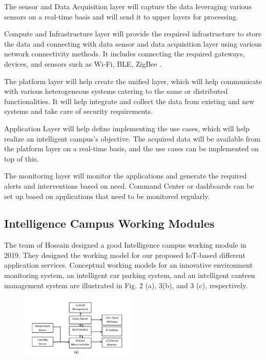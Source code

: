 \documentclass[conference]{IEEEtran}
\begin{document}
The sensor and Data Acquisition layer will capture the data leveraging various sensors on a real-time basis and will send it to upper layers for processing. 

Compute and Infrastructure layer will provide the required infrastructure to store the data and connecting with data sensor and data acquisition layer using various network connectivity methods. It includes connecting the required gateways, devices, and sensors such as Wi-Fi, BLE, ZigBee \cite{INTCAMPUS:IOTBasedModel}. 

The platform layer will help create the unified layer, which will help communicate with various heterogeneous systems catering to the same or distributed functionalities. It will help integrate and collect the data from existing and new systems and take care of security requirements.

Application Layer will help define implementing the use cases, which will help realize an intelligent campus's objective. The acquired data will be available from the platform layer on a real-time basis, and the use cases can be implemented on top of this.

The monitoring layer will monitor the applications and generate the required alerts and interventions based on need. Command Center or dashboards can be set up based on applications that need to be monitored regularly.

\subsection{Intelligence Campus Working Modules}
The team of Hossain designed a good Intelligence campus working module in 2019. They designed the working model for our proposed IoT-based different application services. Conceptual working models for an innovative environment monitoring system, an intelligent car parking system, and an intelligent canteen management system are illustrated in Fig. 2 (a), 3(b), and 3 (c), respectively\cite{INTCAMPUS:IOTBasedModel}. 



\begin{figure}
    \centering
    \includegraphics[width=0.5\textwidth]{bibliography/images/a.png}
\end{figure}
\end{document}
